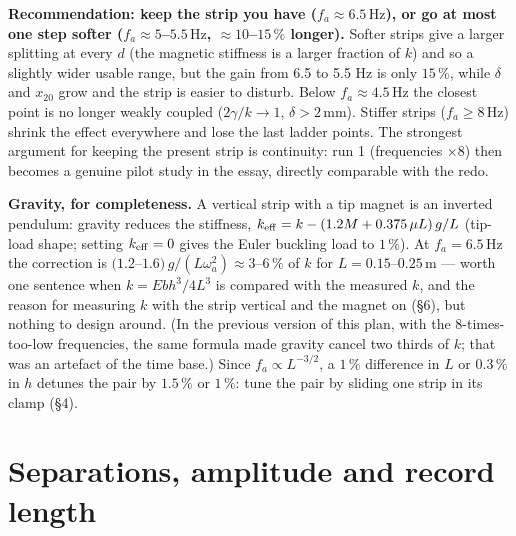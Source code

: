 \documentclass[11pt,a4paper]{article}
\newcommand{\un}[1]{\,\mathrm{#1}}
\begin{document}
\textbf{Recommendation: keep the strip you have ($f_a\approx6.5\un{Hz}$), or go at most one step softer ($f_a\approx5$--$5.5\un{Hz}$, $\approx10$--$15\,\%$ longer).} Softer strips give a larger splitting at every $d$ (the magnetic stiffness is a larger fraction of $k$) and so a slightly wider usable range, but the gain from 6.5 to 5.5 Hz is only $15\,\%$, while $\delta$ and $x_{20}$ grow and the strip is easier to disturb. Below $f_a\approx4.5\un{Hz}$ the closest point is no longer weakly coupled ($2\gamma/k\to1$, $\delta>2\un{mm}$). Stiffer strips ($f_a\ge8\un{Hz}$) shrink the effect everywhere and lose the last ladder points. The strongest argument for keeping the present strip is continuity: run 1 (frequencies $\times8$) then becomes a genuine pilot study in the essay, directly comparable with the redo.

\begin{why}
\textbf{Gravity, for completeness.} A vertical strip with a tip magnet is an inverted pendulum: gravity reduces the stiffness, $k_{\rm eff}=k-(1.2M+0.375\,\mu L)\,g/L$ (tip-load shape; setting $k_{\rm eff}=0$ gives the Euler buckling load to $1\,\%$). At $f_a=6.5\un{Hz}$ the correction is $(1.2$--$1.6)\,g/(L\omega_a^2)\approx3$--$6\,\%$ of $k$ for $L=0.15$--$0.25\un{m}$ --- worth one sentence when $k=Ebh^3/4L^3$ is compared with the measured $k$, and the reason for measuring $k$ with the strip vertical and the magnet on (\S6), but nothing to design around. (In the previous version of this plan, with the 8-times-too-low frequencies, the same formula made gravity cancel two thirds of $k$; that was an artefact of the time base.) Since $f_a\propto L^{-3/2}$, a $1\,\%$ difference in $L$ or $0.3\,\%$ in $h$ detunes the pair by $1.5\,\%$ or $1\,\%$: tune the pair by sliding one strip in its clamp (\S4).
\end{why}

\section{Separations, amplitude and record length}
\end{document}
